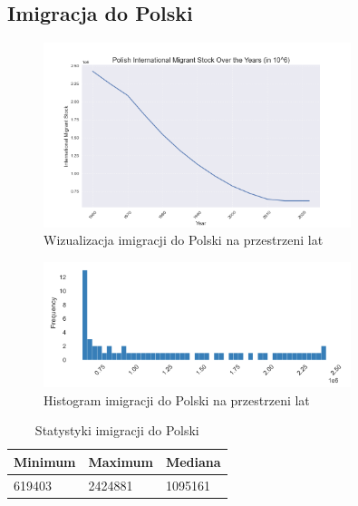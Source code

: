 \documentclass[11pt]{article}
\begin{document}
\subsection{Imigracja do Polski}
\begin{figure}[H]
        \centering
        \includegraphics[width=0.8\textwidth]{polish_int_migrant_stock_over_the_years.png}
        \caption{Wizualizacja imigracji do Polski na przestrzeni lat}
\end{figure}
\begin{figure}[H]
        \centering
        \includegraphics[width=0.8\textwidth]{images/histogram_imigracja.png}
        \caption{Histogram imigracji do Polski na przestrzeni lat}
\end{figure}
\begin{table}[H]
        \centering
        \begin{tabular}{|l|l|l|}
        \hline
        Minimum & Maximum & Mediana \\ \hline
        619403 & 2424881 & 1095161 \\ \hline
        \end{tabular}
        \caption{Statystyki imigracji do Polski}
        \end{table}
\end{document}

